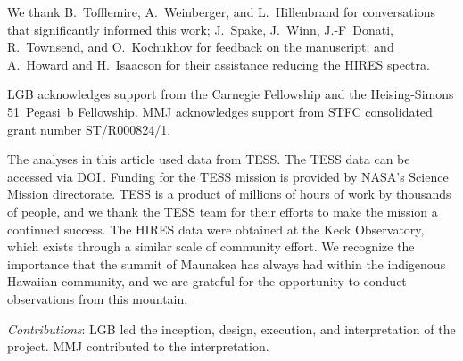 \documentclass[11pt,twocolumn,tighten]{aastex7}
\begin{document}
\begin{acknowledgements}
  We thank B.~Tofflemire, A.~Weinberger, and L.~Hillenbrand for
  conversations that significantly informed this work; J.~Spake,
  J.~Winn, J.-F~Donati, R.~Townsend, and O.~Kochukhov for feedback on the
  manuscript; and A.~Howard and H.~Isaacson for their assistance
  reducing the HIRES spectra.

  LGB acknowledges support from the Carnegie Fellowship and the
  Heising-Simons 51~Pegasi~b Fellowship.
  MMJ acknowledges support from STFC consolidated grant
  number ST/R000824/1.

  The analyses in this article used data from TESS.  
  The TESS data can be accessed via
  DOI\,.
  Funding for the TESS mission is provided by NASA’s Science Mission
  directorate.
  TESS is a product of millions of hours of work by thousands of
  people, and we thank the TESS team for their efforts to make the
  mission a continued success.
  The HIRES data were obtained at the Keck Observatory, which exists
  through a similar scale of community effort.
  We recognize the importance that the summit of Maunakea has always
  had within the indigenous Hawaiian community, and we are grateful
  for the opportunity to conduct observations from this mountain.
\end{acknowledgements}

{\it \large Contributions}: 
LGB led the inception, design, execution, and interpretation of the
project.  MMJ contributed to the interpretation.







\end{document}
